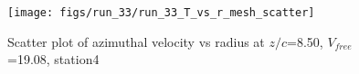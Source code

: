 \begin{figure}[H]
\centering
\texttt{[image: figs/run\_33/run\_33\_T\_vs\_r\_mesh\_scatter]}
\caption{Scatter plot of azimuthal velocity vs radius at $z/c$=8.50, $V_{free}$=19.08, station4}
\label{fig:run_33_T_vs_r_mesh_scatter}
\end{figure}


